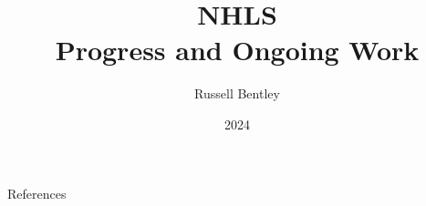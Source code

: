 \documentclass{beamer}
\title{NHLS\\Progress and Ongoing Work}
\author{Russell Bentley}
\institute{Stony Brook}
\date{2024}
\begin{document}
\frame{\titlepage}







\begin{frame}[allowframebreaks]{References}
    \tiny
    \printbibliography
\end{frame}
\end{document}
